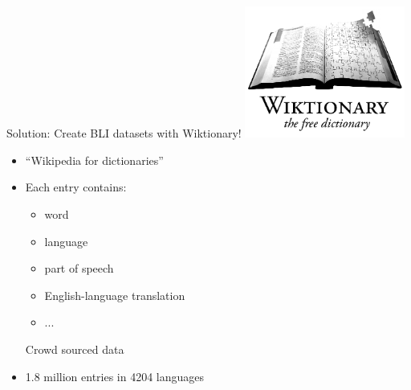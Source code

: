 \documentclass{beamer}
\begin{document}

\begin{frame}{Solution: Create BLI datasets with Wiktionary!}
        \hspace{2.5in}\includegraphics[height=1.7in]{img/Wiktionary-logo_wpstyle-en_with_transparency}

            \vspace{-1.7in}
    \begin{itemize}
        \item ``Wikipedia for dictionaries''

            \vspace{0.15in}
        \item Each entry contains:
            \begin{itemize}
                \item word
                \item language
                \item part of speech
                \item English-language translation
                \item ...
            \end{itemize}

            \vspace{0.15in}
            Crowd sourced data

            \vspace{0.15in}
        \item 1.8 million entries in 4204 languages
    \end{itemize}
\end{frame}

\end{document}
